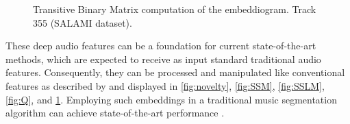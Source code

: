 \begin{figure}[ht]
\begin{minipage}{0.45\textwidth}
        \caption[Transitive Binary Similarity Matrix | Track 355 (SALAMI dataset)]{Transitive Binary Matrix computation of the embeddiogram. Track 355 (SALAMI dataset).}
        \label{fig:TBSM}
    \end{minipage}
\end{figure}


These deep audio features can be a foundation for current state-of-the-art methods, which are expected to receive as input standard traditional audio features. Consequently, they can be processed and manipulated like conventional features as described by \cite{unsuperMSA} and displayed in \ref{fig:novelty}, \ref{fig:SSM}, \ref{fig:SSLM}, \ref{fig:Q}, and \ref{fig:TBSM}. Employing such embeddings in a traditional music segmentation algorithm can achieve state-of-the-art performance \cite{deepfeaturesegment}.

\newpage